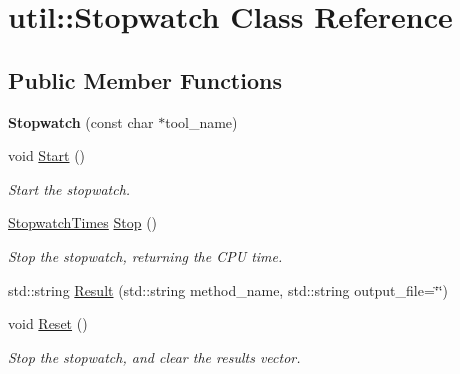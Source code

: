 \hypertarget{classutil_1_1Stopwatch}{\section{util\-:\-:Stopwatch Class Reference}
\label{classutil_1_1Stopwatch}
}
\subsection*{Public Member Functions}
\begin{DoxyCompactItemize}
\item 
\hypertarget{classutil_1_1Stopwatch_af8055e6f405f2093127dcb08a33dd6ab}{{\bfseries Stopwatch} (const char $\ast$tool\-\_\-name)}\label{classutil_1_1Stopwatch_af8055e6f405f2093127dcb08a33dd6ab}

\item 
\hypertarget{classutil_1_1Stopwatch_aaf40a5394011e56a8a51e4b87467e556}{void \hyperlink{classutil_1_1Stopwatch_aaf40a5394011e56a8a51e4b87467e556}{Start} ()}\label{classutil_1_1Stopwatch_aaf40a5394011e56a8a51e4b87467e556}

\begin{DoxyCompactList}\small\item\em Start the stopwatch. \end{DoxyCompactList}\item 
\hypertarget{classutil_1_1Stopwatch_a0dbc5976e1bd883b0fcf382d6dd1d9ed}{\hyperlink{structutil_1_1StopwatchTimes}{Stopwatch\-Times} \hyperlink{classutil_1_1Stopwatch_a0dbc5976e1bd883b0fcf382d6dd1d9ed}{Stop} ()}\label{classutil_1_1Stopwatch_a0dbc5976e1bd883b0fcf382d6dd1d9ed}

\begin{DoxyCompactList}\small\item\em Stop the stopwatch, returning the C\-P\-U time. \end{DoxyCompactList}\item 
std\-::string \hyperlink{classutil_1_1Stopwatch_a089b8a02ad5a8c15f6310c6ee99911a6}{Result} (std\-::string method\-\_\-name, std\-::string output\-\_\-file=\char`\"{}\char`\"{})
\item 
\hypertarget{classutil_1_1Stopwatch_a86422283a59fda34c035f3a043192e28}{void \hyperlink{classutil_1_1Stopwatch_a86422283a59fda34c035f3a043192e28}{Reset} ()}\label{classutil_1_1Stopwatch_a86422283a59fda34c035f3a043192e28}

\begin{DoxyCompactList}\small\item\em Stop the stopwatch, and clear the results vector. \end{DoxyCompactList}\end{DoxyCompactItemize}


